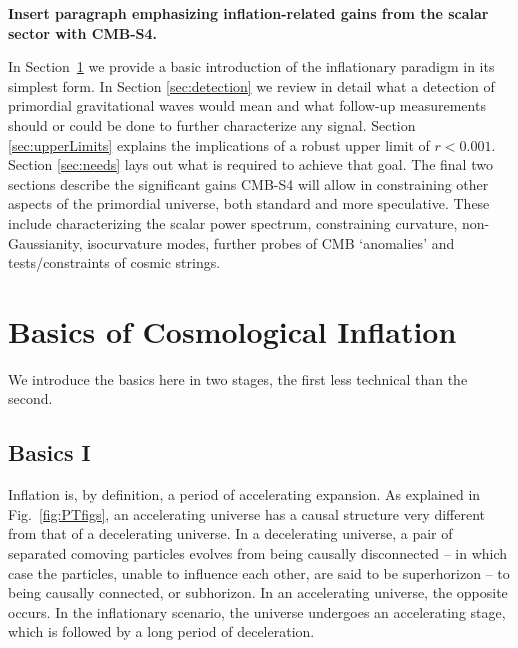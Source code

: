 {\bf Insert paragraph emphasizing inflation-related gains from the scalar sector with CMB-S4.}

In Section~\ref{sec:basics} we provide a basic introduction of the inflationary paradigm in its simplest form. In Section \ref{sec:detection} we review in detail what a detection of primordial gravitational waves would mean and what follow-up measurements should or could be done to further characterize any signal. Section \ref{sec:upperLimits} explains the implications of a robust upper limit of $r<0.001$. Section \ref{sec:needs} lays out what is required to achieve that goal. The final two sections describe the significant gains CMB-S4 will allow in constraining other aspects of the primordial universe, both standard and more speculative. These include characterizing the scalar power spectrum, constraining curvature, non-Gaussianity, isocurvature modes, further probes of CMB `anomalies' and tests/constraints of cosmic strings.
 


\section{Basics of Cosmological Inflation}
\label{sec:basics}

We introduce the basics here in two stages, the first less technical than the second.

\subsection{Basics I}

Inflation is, by definition, a period of accelerating expansion. As explained in Fig.~\ref{fig:PTfigs}, an accelerating universe has a causal structure very different from that of a decelerating universe. In a decelerating universe, a pair of separated comoving particles evolves from being causally disconnected -- in which case the particles, unable to influence each other, are said to be superhorizon -- to being causally connected, or subhorizon. In an accelerating universe, the opposite occurs. In the inflationary scenario, the universe undergoes an accelerating stage, which is followed by a long period of deceleration.


